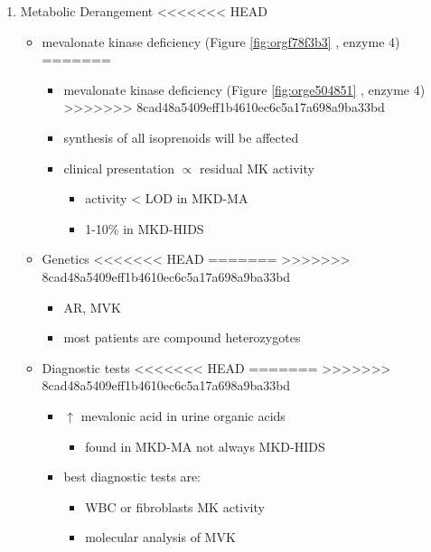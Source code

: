 \documentclass{scrartcl}
\begin{document}
\begin{itemize}
\begin{enumerate}
\begin{enumerate}
\item Metabolic Derangement
<<<<<<< HEAD
\label{sec:org01e98c8}
\begin{itemize}
\item mevalonate kinase deficiency (Figure \ref{fig:orgf78f3b3} , enzyme 4)
=======
\label{sec:orgb4ec09e}
\begin{itemize}
\item mevalonate kinase deficiency (Figure \ref{fig:orge504851} , enzyme 4)
>>>>>>> 8cad48a5409eff1b4610ec6c5a17a698a9ba33bd
\end{itemize}
\begin{itemize}
\item synthesis of all isoprenoids will be affected
\item clinical presentation \(\propto\) residual MK activity
\begin{itemize}
\item activity < LOD in MKD-MA
\item 1-10\% in MKD-HIDS
\end{itemize}
\end{itemize}

\item Genetics
<<<<<<< HEAD
\label{sec:org68c9cb6}
=======
\label{sec:org21dbac4}
>>>>>>> 8cad48a5409eff1b4610ec6c5a17a698a9ba33bd
\begin{itemize}
\item AR, MVK
\item most patients are compound heterozygotes
\end{itemize}

\item Diagnostic tests
<<<<<<< HEAD
\label{sec:org1635626}
=======
\label{sec:orgee5fcdb}
>>>>>>> 8cad48a5409eff1b4610ec6c5a17a698a9ba33bd
\begin{itemize}
\item \(\uparrow\) mevalonic acid in urine organic acids
\begin{itemize}
\item found in MKD-MA not always MKD-HIDS
\end{itemize}
\item best diagnostic tests are:
\begin{itemize}
\item WBC or fibroblasts MK activity
\item molecular analysis of MVK
\end{itemize}
\end{itemize}


\end{itemize}
\end{enumerate}
\end{enumerate}
\end{itemize}
\end{document}
